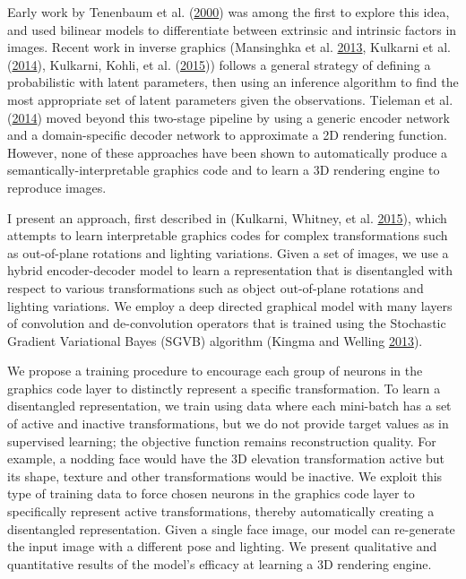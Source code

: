 \documentclass[12pt,twoside]{mitthesis}
\begin{document}
Early work by Tenenbaum et al.
(\protect\hyperlink{ref-tenenbaum2000separating}{2000}) was among the
first to explore this idea, and used bilinear models to differentiate
between extrinsic and intrinsic factors in images. Recent work in
inverse graphics (Mansinghka et al.
\protect\hyperlink{ref-mansinghka2013approximate}{2013}, Kulkarni et al.
(\protect\hyperlink{ref-kulkarni2014inverse}{2014}), Kulkarni, Kohli, et
al. (\protect\hyperlink{ref-kulkarni2015picture}{2015})) follows a
general strategy of defining a probabilistic with latent parameters,
then using an inference algorithm to find the most appropriate set of
latent parameters given the observations. Tieleman et al.
(\protect\hyperlink{ref-tieleman2014optimizing}{2014}) moved beyond this
two-stage pipeline by using a generic encoder network and a
domain-specific decoder network to approximate a 2D rendering function.
However, none of these approaches have been shown to automatically
produce a semantically-interpretable graphics code and to learn a 3D
rendering engine to reproduce images.

I present an approach, first described in (Kulkarni, Whitney, et al.
\protect\hyperlink{ref-kulkarni2015deep}{2015}), which attempts to learn
interpretable graphics codes for complex transformations such as
out-of-plane rotations and lighting variations. Given a set of images,
we use a hybrid encoder-decoder model to learn a representation that is
disentangled with respect to various transformations such as object
out-of-plane rotations and lighting variations. We employ a deep
directed graphical model with many layers of convolution and
de-convolution operators that is trained using the Stochastic Gradient
Variational Bayes (SGVB) algorithm (Kingma and Welling
\protect\hyperlink{ref-kingma2013auto}{2013}).

We propose a training procedure to encourage each group of neurons in
the graphics code layer to distinctly represent a specific
transformation. To learn a disentangled representation, we train using
data where each mini-batch has a set of active and inactive
transformations, but we do not provide target values as in supervised
learning; the objective function remains reconstruction quality. For
example, a nodding face would have the 3D elevation transformation
active but its shape, texture and other transformations would be
inactive. We exploit this type of training data to force chosen neurons
in the graphics code layer to specifically represent active
transformations, thereby automatically creating a disentangled
representation. Given a single face image, our model can re-generate the
input image with a different pose and lighting. We present qualitative
and quantitative results of the model's efficacy at learning a 3D
rendering engine.
\end{document}
